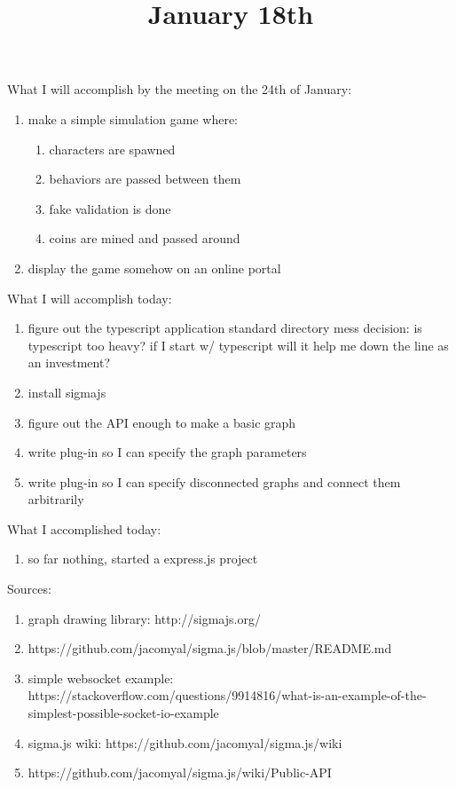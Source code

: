 \title{January 18th}


What I will accomplish by the meeting on the 24th of January:

\begin{enumerate}
	\item make a simple simulation game where:
		\begin{enumerate}
			\item characters are spawned
			\item behaviors are passed between them
			\item fake validation is done 
			\item coins are mined and passed around
		\end{enumerate}
	\item display the game somehow on an online portal
\end{enumerate}

What I will accomplish today:

\begin{enumerate}
	\item figure out the typescript application standard directory mess
		decision: is typescript too heavy?
		if I start w/ typescript will it help me down the line as an investment?
	\item install sigmajs
	\item figure out the API enough to make a basic graph
	\item write plug-in so I can specify the graph parameters
	\item write plug-in so I can specify disconnected graphs and connect them arbitrarily
\end{enumerate}


What I accomplished today:

\begin{enumerate}
	\item so far nothing, started a express.js project
\end{enumerate}

Sources:

\begin{enumerate}
	\item graph drawing library: http://sigmajs.org/
	\item https://github.com/jacomyal/sigma.js/blob/master/README.md
	\item simple websocket example: https://stackoverflow.com/questions/9914816/what-is-an-example-of-the-simplest-possible-socket-io-example
	\item sigma.js wiki: https://github.com/jacomyal/sigma.js/wiki
	\item https://github.com/jacomyal/sigma.js/wiki/Public-API
\end{enumerate}



